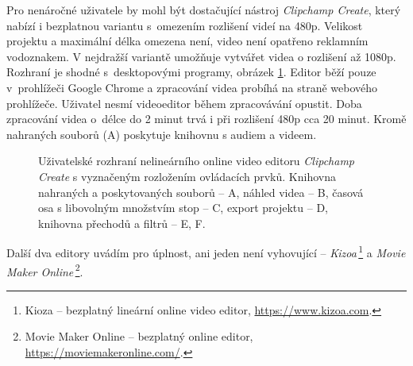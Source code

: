 Pro nenáročné uživatele by mohl být dostačující nástroj \textit{Clipchamp Create}, který nabízí i bezplatnou variantu s~omezením rozlišení videí na 480p. Velikost projektu a maximální délka omezena není, video není opatřeno reklamním vodoznakem. V nejdražší variantě umožňuje vytvářet videa o rozlišení až 1080p. Rozhraní je shodné s~desktopovými programy, obrázek \ref{img:clipchamp}. Editor běží pouze v~prohlížeči Google Chrome a zpracování videa probíhá na straně webového prohlížeče. Uživatel nesmí videoeditor během zpracovávání opustit. Doba zpracování videa o~délce do 2 minut trvá i při rozlišení 480p cca 20 minut. Kromě nahraných souborů (A) poskytuje knihovnu s audiem a videem.
\begin{figure}[h]
	\centering
	\caption{Uživatelské rozhraní nelineárního online video editoru \textit{Clipchamp Create} s vyznačeným rozložením ovládacích prvků. Knihovna nahraných a poskytovaných souborů -- A, náhled videa -- B, časová osa s libovolným množstvím stop -- C, export projektu -- D, knihovna přechodů a filtrů -- E, F.}\label{img:clipchamp}
\end{figure}

Další dva editory uvádím pro úplnost, ani jeden není vyhovující -- \textit{Kizoa}\,\footnote{Kioza -- bezplatný lineární online video editor, \url{https://www.kizoa.com}.} a \textit{Movie Maker Online}\,\footnote{Movie Maker Online -- bezplatný online editor, \url{https://moviemakeronline.com/}.}.

